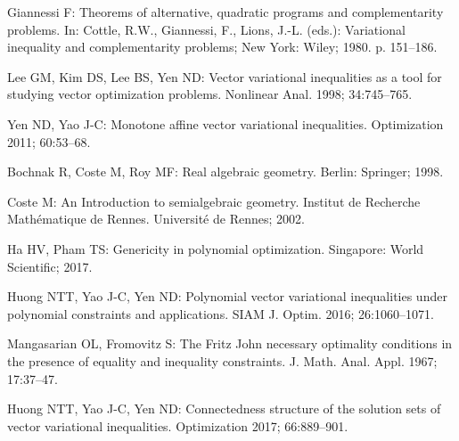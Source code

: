 \documentclass[]{interact}
\theoremstyle{plain}%
\theoremstyle{definition}
\begin{document}




\begin{thebibliography}{99}

  Giannessi F: Theorems of alternative,
quadratic programs and complementarity problems. In: Cottle, R.W., Giannessi, F., Lions, J.-L. (eds.): Variational
	inequality and complementarity problems;  New York: Wiley; 1980. p. 151--186.

 Lee GM, Kim DS, Lee BS, Yen ND: Vector variational inequalities as a tool for studying vector	optimization problems. Nonlinear Anal. 1998; 34:745--765.

 Yen ND, Yao J-C: Monotone affine vector variational inequalities.  Optimization 2011; 60:53--68.

  Bochnak R, Coste M, Roy MF: Real algebraic geometry. Berlin: Springer; 1998.

 Coste M: An Introduction to semialgebraic geometry. Institut de Recherche Math\'ematique de Rennes. Universit\'e de Rennes; 2002.

 Ha HV, Pham TS: Genericity in polynomial optimization. Singapore: World Scientific; 2017.

 Huong NTT, Yao J-C, Yen ND: Polynomial vector variational inequalities under polynomial constraints and applications. SIAM J. Optim. 2016; 26:1060--1071.

  Mangasarian OL, Fromovitz  S: The Fritz John necessary optimality conditions in the presence of equality and inequality constraints. J. Math. Anal. Appl. 1967; 17:37--47. 

 Huong NTT, Yao J-C, Yen ND: Connectedness structure of the solution sets of vector variational inequalities. Optimization 2017; 66:889--901.


\end{thebibliography}
\end{document}
